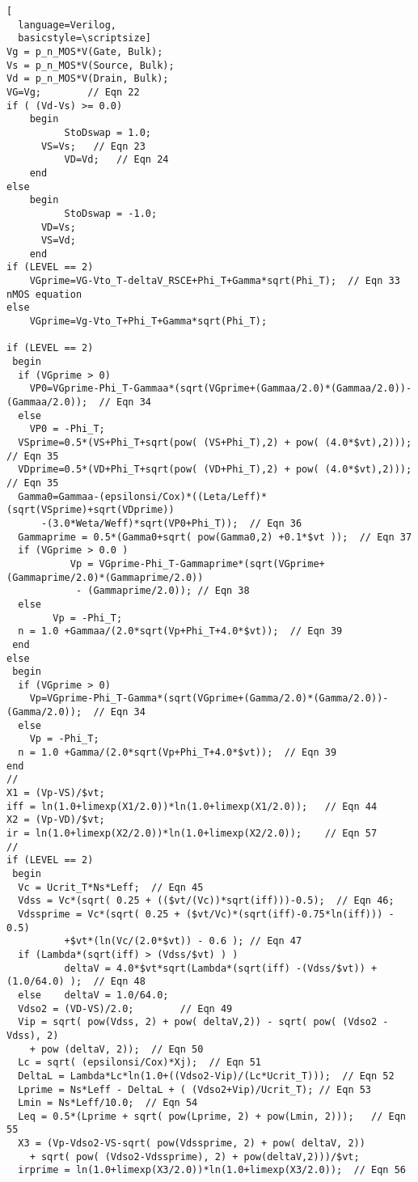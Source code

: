\begin{lstlisting}[
  language=Verilog,
  basicstyle=\scriptsize]
Vg = p_n_MOS*V(Gate, Bulk); 
Vs = p_n_MOS*V(Source, Bulk);
Vd = p_n_MOS*V(Drain, Bulk);
VG=Vg;        // Eqn 22
if ( (Vd-Vs) >= 0.0)
	begin
          StoDswap = 1.0;
	  VS=Vs;   // Eqn 23
          VD=Vd;   // Eqn 24
	end
else
	begin
          StoDswap = -1.0;
	  VD=Vs;
	  VS=Vd;
	end
if (LEVEL == 2)
    VGprime=VG-Vto_T-deltaV_RSCE+Phi_T+Gamma*sqrt(Phi_T);  // Eqn 33  nMOS equation
else
    VGprime=Vg-Vto_T+Phi_T+Gamma*sqrt(Phi_T);

if (LEVEL == 2)
 begin
  if (VGprime > 0)
	VP0=VGprime-Phi_T-Gammaa*(sqrt(VGprime+(Gammaa/2.0)*(Gammaa/2.0))-(Gammaa/2.0));  // Eqn 34
  else
	VP0 = -Phi_T;
  VSprime=0.5*(VS+Phi_T+sqrt(pow( (VS+Phi_T),2) + pow( (4.0*$vt),2)));  // Eqn 35
  VDprime=0.5*(VD+Phi_T+sqrt(pow( (VD+Phi_T),2) + pow( (4.0*$vt),2)));  // Eqn 35
  Gamma0=Gammaa-(epsilonsi/Cox)*((Leta/Leff)*(sqrt(VSprime)+sqrt(VDprime))
	  -(3.0*Weta/Weff)*sqrt(VP0+Phi_T));  // Eqn 36
  Gammaprime = 0.5*(Gamma0+sqrt( pow(Gamma0,2) +0.1*$vt ));  // Eqn 37 
  if (VGprime > 0.0 )
           Vp = VGprime-Phi_T-Gammaprime*(sqrt(VGprime+(Gammaprime/2.0)*(Gammaprime/2.0)) 
	        - (Gammaprime/2.0)); // Eqn 38
  else
        Vp = -Phi_T;
  n = 1.0 +Gammaa/(2.0*sqrt(Vp+Phi_T+4.0*$vt));  // Eqn 39
 end
else
 begin
  if (VGprime > 0)
	Vp=VGprime-Phi_T-Gamma*(sqrt(VGprime+(Gamma/2.0)*(Gamma/2.0))-(Gamma/2.0));  // Eqn 34
  else
	Vp = -Phi_T;
  n = 1.0 +Gamma/(2.0*sqrt(Vp+Phi_T+4.0*$vt));  // Eqn 39
end
//
X1 = (Vp-VS)/$vt;
iff = ln(1.0+limexp(X1/2.0))*ln(1.0+limexp(X1/2.0));   // Eqn 44
X2 = (Vp-VD)/$vt;
ir = ln(1.0+limexp(X2/2.0))*ln(1.0+limexp(X2/2.0));    // Eqn 57
//
if (LEVEL == 2)
 begin
  Vc = Ucrit_T*Ns*Leff;  // Eqn 45
  Vdss = Vc*(sqrt( 0.25 + (($vt/(Vc))*sqrt(iff)))-0.5);  // Eqn 46;
  Vdssprime = Vc*(sqrt( 0.25 + ($vt/Vc)*(sqrt(iff)-0.75*ln(iff))) - 0.5) 
	      +$vt*(ln(Vc/(2.0*$vt)) - 0.6 ); // Eqn 47
  if (Lambda*(sqrt(iff) > (Vdss/$vt) ) )
          deltaV = 4.0*$vt*sqrt(Lambda*(sqrt(iff) -(Vdss/$vt)) + (1.0/64.0) );  // Eqn 48
  else    deltaV = 1.0/64.0;
  Vdso2 = (VD-VS)/2.0;        // Eqn 49
  Vip = sqrt( pow(Vdss, 2) + pow( deltaV,2)) - sqrt( pow( (Vdso2 - Vdss), 2) 
	+ pow (deltaV, 2));  // Eqn 50
  Lc = sqrt( (epsilonsi/Cox)*Xj);  // Eqn 51
  DeltaL = Lambda*Lc*ln(1.0+((Vdso2-Vip)/(Lc*Ucrit_T)));  // Eqn 52
  Lprime = Ns*Leff - DeltaL + ( (Vdso2+Vip)/Ucrit_T); // Eqn 53
  Lmin = Ns*Leff/10.0;  // Eqn 54
  Leq = 0.5*(Lprime + sqrt( pow(Lprime, 2) + pow(Lmin, 2)));   // Eqn 55
  X3 = (Vp-Vdso2-VS-sqrt( pow(Vdssprime, 2) + pow( deltaV, 2)) 
	+ sqrt( pow( (Vdso2-Vdssprime), 2) + pow(deltaV,2)))/$vt;
  irprime = ln(1.0+limexp(X3/2.0))*ln(1.0+limexp(X3/2.0));  // Eqn 56

\end{lstlisting}

